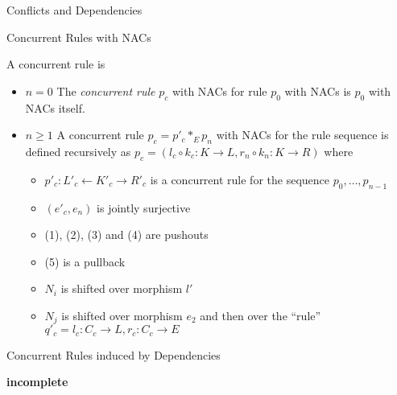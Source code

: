 \begin{definition}{Conflicts and Dependencies}
\end{definition}

\begin{definition}{Concurrent Rules with NACs}

A concurrent rule is
\end{definition}

\centerline{
}

\begin{itemize}
\item $n = 0$ The \emph{concurrent rule} $p_c$ with NACs for rule $p_0$ with NACs is $p_0$ with NACs itself.
\item $n \geqslant 1$ A concurrent rule $p_c = p'_c \ast_E p_n $ with NACs for the rule sequence  is defined recursively as $p_c = (l_c \circ k_c : K \rightarrow L, r_n \circ k_n : K \rightarrow R)$ where 
  \begin{itemize}
  \item $p'_c : L'_c \leftarrow K'_c \rightarrow R'_c$ is a concurrent rule for the sequence $p_0,\ldots,p_{n-1}$
  \item $(e'_c,e_n)$ is jointly surjective
  \item (1), (2), (3) and (4) are pushouts
  \item (5) is a pullback
  \item $N_i$ is shifted over morphism $l'$
  \item $N_j$ is shifted over morphism $e_2$ and then over the ``rule'' $q'_c = l_c : C_c \rightarrow L, r_c : C_c \rightarrow E$
  \end{itemize}
\end{itemize}

\begin{definition}{Concurrent Rules induced by Dependencies}

  \textbf{incomplete}


\end{definition}

